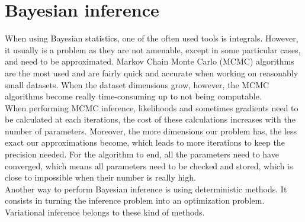 \documentclass{article}
\begin{document}
\section{Bayesian inference}
When using Bayesian statistics, one of the often used tools is integrals. However, it usually is a problem as they are not amenable, except in some particular cases, and need to be approximated. Markov Chain Monte Carlo (MCMC) algorithms are the most used and are fairly quick and accurate when working on reasonably small datasets. When the dataset dimensions grow, however, the MCMC algorithms become really time-consuming up to not being computable.\\
\newline
%
When performing MCMC inference, likelihoods and sometimes gradients need to be calculated at each iterations, the cost of these calculations increases with the number of parameters. Moreover, the more dimensions our problem has, the less exact our approximations become, which leads to more iterations to keep the precision needed. For the algorithm to end, all the parameters need to have converged, which means all parameters need to be checked and stored, which is close to impossible when their number is really high.\\
\newline
Another way to perform Bayesian inference is using deterministic methods. It consists in turning the inference problem into an optimization problem. Variational inference belongs to these kind of methods.
\end{document}
